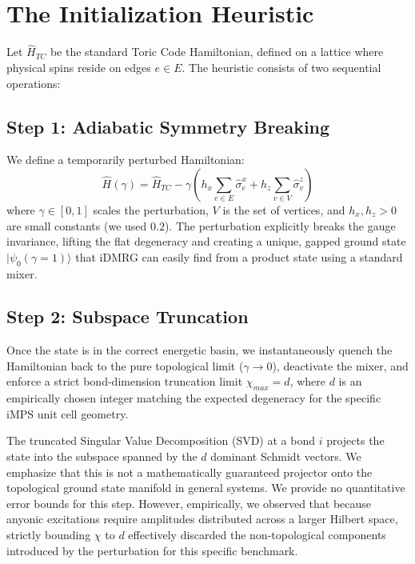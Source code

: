 \documentclass[aps,prb,reprint,superscriptaddress,amsmath,amssymb]{revtex4-2}
\begin{document}
\section{\label{sec:method}The Initialization Heuristic}
Let $\hat{H}_{TC}$ be the standard Toric Code Hamiltonian, defined on a lattice where physical spins reside on edges $e \in E$. The heuristic consists of two sequential operations:

\subsection{\label{sec:pert}Step 1: Adiabatic Symmetry Breaking}
We define a temporarily perturbed Hamiltonian:
\begin{equation}
    \hat{H}(\gamma) = \hat{H}_{TC} - \gamma \left( h_x \sum_{e \in E} \hat{\sigma}^x_e + h_z \sum_{v \in V} \hat{\sigma}^z_v \right)
\end{equation}
where $\gamma \in [0, 1]$ scales the perturbation, $V$ is the set of vertices, and $h_x, h_z > 0$ are small constants (we used $0.2$). The perturbation explicitly breaks the gauge invariance, lifting the flat degeneracy and creating a unique, gapped ground state $|\psi_0(\gamma=1)\rangle$ that iDMRG can easily find from a product state using a standard mixer.

\subsection{\label{sec:proj}Step 2: Subspace Truncation}
Once the state is in the correct energetic basin, we instantaneously quench the Hamiltonian back to the pure topological limit ($\gamma \to 0$), deactivate the mixer, and enforce a strict bond-dimension truncation limit $\chi_{max} = d$, where $d$ is an empirically chosen integer matching the expected degeneracy for the specific iMPS unit cell geometry.

The truncated Singular Value Decomposition (SVD) at a bond $i$ projects the state into the subspace spanned by the $d$ dominant Schmidt vectors. We emphasize that this is not a mathematically guaranteed projector onto the topological ground state manifold in general systems. We provide no quantitative error bounds for this step. However, empirically, we observed that because anyonic excitations require amplitudes distributed across a larger Hilbert space, strictly bounding $\chi$ to $d$ effectively discarded the non-topological components introduced by the perturbation for this specific benchmark.
\end{document}
